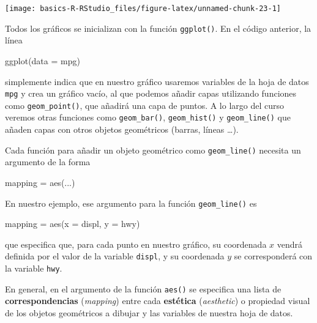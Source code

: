 \documentclass[
  degree=mecinf,
  title=normal,
  toc=normal,
  bib=normal]{mnye}
\newenvironment{Shaded}{\begin{snugshade}}{\end{snugshade}}
\newcommand{\AttributeTok}[1]{\textcolor[rgb]{0.77,0.63,0.00}{#1}}
\newcommand{\FunctionTok}[1]{\textcolor[rgb]{0.00,0.00,0.00}{#1}}
\newcommand{\NormalTok}[1]{#1}
\newcommand{\OtherTok}[1]{\textcolor[rgb]{0.56,0.35,0.01}{#1}}
\begin{document}
\begin{center}\texttt{[image: basics-R-RStudio\_files/figure-latex/unnamed-chunk-23-1]} \end{center}

Todos los gráficos se inicializan con la función \texttt{ggplot()}. En el código anterior, la línea

\begin{Shaded}
\begin{Highlighting}[]
\FunctionTok{ggplot}\NormalTok{(}\AttributeTok{data =}\NormalTok{ mpg)}
\end{Highlighting}
\end{Shaded}

simplemente indica que en nuestro gráfico usaremos variables de la hoja de datos \texttt{mpg} y crea un gráfico vacío, al que podemos añadir capas utilizando funciones como \texttt{geom\_point()}, que añadirá una capa de puntos. A lo largo del curso veremos otras funciones como \texttt{geom\_bar()}, \texttt{geom\_hist()} y \texttt{geom\_line()} que añaden capas con otros objetos geométricos (barras, líneas \ldots).

Cada función para añadir un objeto geométrico como \texttt{geom\_line()} necesita un argumento de la forma

\begin{Shaded}
\begin{Highlighting}[]
\NormalTok{mapping }\OtherTok{=} \FunctionTok{aes}\NormalTok{(...)}
\end{Highlighting}
\end{Shaded}

En nuestro ejemplo, ese argumento para la función \texttt{geom\_line()} es

\begin{Shaded}
\begin{Highlighting}[]
\NormalTok{mapping }\OtherTok{=} \FunctionTok{aes}\NormalTok{(}\AttributeTok{x =}\NormalTok{ displ, }\AttributeTok{y =}\NormalTok{ hwy)}
\end{Highlighting}
\end{Shaded}

que especifica que, para cada punto en nuestro gráfico, su coordenada \(x\) vendrá definida por el valor de la variable \texttt{displ}, y su coordenada \(y\) se corresponderá con la variable \texttt{hwy}.

En general, en el argumento de la función \texttt{aes()} se especifica una lista de \textbf{correspondencias} (\emph{mapping}) entre cada \textbf{estética} (\emph{aesthetic}) o propiedad visual de los objetos geométricos a dibujar y las variables de nuestra hoja de datos.
\end{document}
